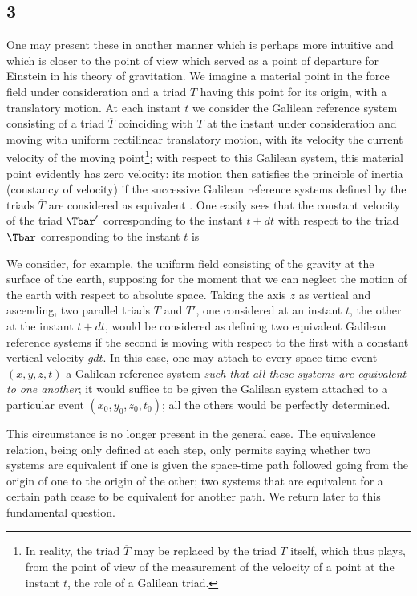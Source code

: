 \subsection*{3}
One may present these in another manner which is perhaps more intuitive and which is closer to the point of view which served as a point of departure for Einstein in his theory of gravitation. We imagine a material point in the force field under consideration and a triad $T$ having this point for its origin,  with a translatory motion. At each instant $t$ we consider the Galilean reference system consisting of a triad $\overline{T}$ coinciding with $T$ at the instant under consideration and moving with uniform rectilinear translatory motion, with its velocity the current velocity of the moving point\footnote{In reality, the triad $\overline{T}$ may be replaced  by the triad $T$ itself, which thus plays, from the point of view of the measurement of the velocity of a point at the instant $t$, the role of a Galilean triad.}; with respect to this Galilean system, this material point evidently has zero velocity: its motion then satisfies the principle of inertia (constancy of velocity) if the successive Galilean reference systems defined by the triads $\overline{T}$ are considered as equivalent \textit{}. One easily sees that the constant velocity of the triad $\Tbar'$ corresponding to the instant $t+dt$ with respect to the triad $\Tbar$ corresponding to the instant $t$ is

We consider, for example, the uniform field consisting of the gravity at the surface of the earth, supposing for the moment that we can neglect the motion of the earth with respect to absolute space. Taking the axis $z$ as vertical and ascending, two parallel triads $T$ and $T'$, one considered at an instant $t$, the other at the instant $t+dt$, would be considered as defining two equivalent Galilean reference systems if the second is moving with respect to the first with a constant vertical velocity $g dt$. In this case, one may attach to every space-time event $(x,y,z,t)$ a Galilean reference system \textit{such that all these systems are equivalent to one another}; it would suffice to be given the Galilean system attached to a particular event $(x_0,y_0,z_0,t_0)$; all the others would be perfectly determined.

This circumstance is no longer present in the general case. The equivalence relation, being only defined at each step, only permits saying whether two systems are equivalent if one is given the space-time path followed going from the origin of one to the origin of the other; two systems that are equivalent for a certain path cease to be equivalent for another path. We return later to this fundamental question.

